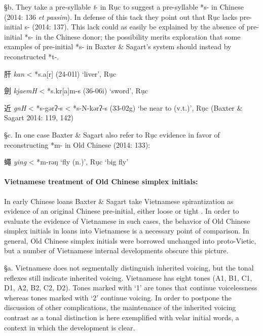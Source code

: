 §b. They take a pre-syllable \emph{t}- in Rục to suggest a pre-syllable
*s- in Chinese (2014: 136 \emph{et passim}). In defense of this tack
they point out that Rục lacks pre-initial s- (2014: 137). This lack
could as easily be explained by the absence of pre-initial *s- in the
Chinese donor; the possibility merits exploration that some examples of
pre-initial *s- in Baxter \& Sagart's system should instead by
reconstructed *t-.

\begin{description} \item
肝 \emph{kan} \textless{} *s.{}a{[}r] (24-01l) `liver', Rục
 \emph{{}}

\item
劍 \emph{kjaemH} \textless{} *s.kr{[}a]m-s (36-06i) `sword', Rục
 \emph{{}}

\item
近 \emph{g{}nH} \textless{} *s-gərʔ-s \textless{} *s-N-kərʔ-s (33-02g)
`be near to (v.t.)', Rục \emph{} (Baxter \& Sagart 2014: 119, 142)
\end{description}

§c. In one case Baxter \& Sagart also refer to Rục evidence in favor of
reconstructing *m- in Old Chinese (2014: 133):

\begin{description} \item
蠅 \emph{ying} \textless{} *m-rəŋ `fly (n.)', Rục \emph{} `big fly'
\end{description}

\paragraph{Vietnamese treatment of Old Chinese
simplex initials:} In early Chinese loans Baxter \& Sagart take
Vietnamese spirantization as evidence of an original Chinese
pre-initial, either loose or tight 
\citeyearpar[47]{Baxter2014OldChinese}. 
In order to evaluate the
evidence of Vietnamese in such cases, the behavior of Old Chinese
simplex initials in loans into Vietnamese is a necessary point of
comparison. In general, Old Chinese simplex initials were borrowed
unchanged into proto-Vietic, but a number of Vietnamese internal
developments obscure this picture.

§a. Vietnamese does not segmentally distinguish inherited voicing, but
the tonal reflexes still indicate inherited voicing. Vietnamese has
eight tones (A1, B1, C1, D1, A2, B2, C2, D2). Tones marked with `1' are
tones that continue voicelessness whereas tones marked with `2' continue
voicing. In order to postpone the discussion of other complications, the
maintenance of the inherited voicing contrast as a tonal distinction is
here exemplified with velar initial words, a context in which the
development is clear.

